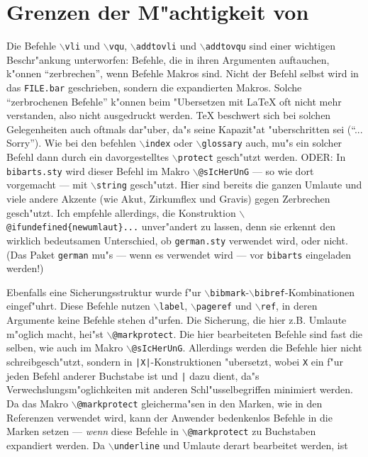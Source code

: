 \documentclass[11pt]{article}                    %
\def\Befehl#1{{\tt$\backslash$#1}}
\begin{document}
    \newpage
    \printind


  \section{Grenzen der M"achtigkeit von \bibarts}

  Die Befehle \Befehl{vli} und
  \Befehl{vqu},\addtobib{vqu@\protect\Befehl{vqu}}
  \Befehl{addtovli}\addtobib{addtovli@\protect\Befehl{addtovli}} und
  \Befehl{addtovqu}\addtobib{addtovqu@\protect\Befehl{addtovqu}} sind einer
  wichtigen Beschr"ankung unterworfen: Befehle, die in ihren Argumenten
  auftauchen, k"onnen "`zerbrechen"', wenn Befehle Makros sind. Nicht der
  Befehl selbst wird in das {\tt FILE.bar} geschrieben, sondern die
  expandierten Makros. Solche "`zerbrochenen Befehle"' k"onnen beim
  "Ubersetzen mit \LaTeX{} oft nicht mehr verstanden, also nicht
  ausgedruckt werden. \TeX{} beschwert sich bei solchen Gelegenheiten auch
  oftmals dar"uber, da"s seine Kapazit"at "uberschritten sei ("`...
  Sorry"'). Wie bei den befehlen \Befehl{index} oder \Befehl{glossary}
  auch, mu"s ein solcher Befehl dann durch ein davorgestelltes
  \Befehl{protect} gesch"utzt werden. ODER: In {\tt bibarts.sty} wird
  dieser Befehl im Makro \Befehl{@sIcHerUnG} --- so wie dort vorgemacht ---
  mit \Befehl{string} gesch"utzt. Hier sind bereits die ganzen Umlaute und
  viele andere Akzente (wie Akut, Zirkumflex und Gravis) gegen Zerbrechen
  gesch"utzt. Ich empfehle allerdings, die Konstruktion
  \Befehl{@ifundefined\{newumlaut\}...} unver"andert zu lassen, denn sie
  erkennt den wirklich bedeutsamen Unterschied, ob {\tt german.sty}
  verwendet wird, oder nicht. (Das Paket {\tt german} mu"s --- wenn es
  verwendet wird --- vor {\tt bibarts} eingeladen werden!)

  Ebenfalls eine Sicherungsstruktur wurde f"ur
  \Befehl{bibmark}-\Befehl{bibref}-Kom\-bi\-na\-tio\-nen eingef"uhrt. Diese
  Befehle nutzen \Befehl{label}, \Befehl{pageref} und \Befehl{ref}, in deren
  Argumente keine Befehle stehen d"urfen. Die Sicherung, die hier z.B.
  Umlaute m"oglich macht, hei"st \Befehl{@markprotect}. Die hier
  bearbeiteten Befehle sind fast die selben, wie auch im Makro
  \Befehl{@sIcHerUnG}. Allerdings werden die Befehle hier nicht
  schreibgesch"utzt, sondern in \verb!|X|!-Konstruktionen "ubersetzt, wobei
  \verb!X! ein f"ur jeden Befehl anderer Buchstabe ist und \verb!|! dazu
  dient, da"s Verwechslungsm"oglichkeiten mit anderen Schl"usselbegriffen
  minimiert werden. Da das Makro \Befehl{@markprotect} gleicherma"sen in
  den Marken, wie in den Referenzen verwendet wird, kann der Anwender
  bedenkenlos Befehle in die Marken setzen --- {\it wenn\/} diese Befehle
  in \Befehl{@markprotect} zu Buchstaben expandiert werden. Da
  \Befehl{underline} und Umlaute derart bearbeitet werden, ist
\end{document}

